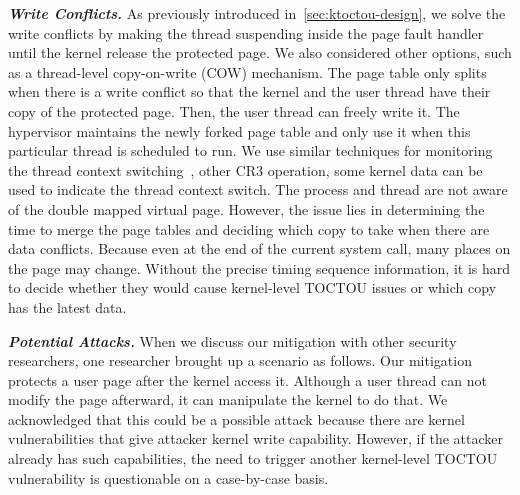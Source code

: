 \textbf{\textit{Write Conflicts.}} As previously introduced in~\autoref{sec:ktoctou-design}, we solve the write conflicts by making the thread suspending inside the page fault handler until the kernel release the protected page. We also considered other options, such as a thread-level copy-on-write (COW) mechanism. The page table only splits when there is a write conflict so that the kernel and the user thread have their copy of the protected page. Then, the user thread can freely write it. The hypervisor maintains the newly forked page table and only use it when this particular thread is scheduled to run. We use similar techniques for monitoring the thread context switching~\cite{pan2017digtool}, other CR3 operation, some kernel data can be used to indicate the thread context switch. The process and thread are not aware of the double mapped virtual page. However, the issue lies in determining the time to merge the page tables and deciding which copy to take when there are data conflicts. Because even at the end of the current system call, many places on the page may change. Without the precise timing sequence information, it is hard to decide whether they would cause kernel-level TOCTOU issues or which copy has the latest data.



\textbf{\textit{Potential Attacks.}} When we discuss our mitigation with other security researchers, one researcher brought up a scenario as follows. Our mitigation protects a user page after the kernel access it. Although a user thread can not modify the page afterward, it can manipulate the kernel to do that. We acknowledged that this could be a possible attack because there are kernel vulnerabilities that give attacker kernel write capability. However, if the attacker already has such capabilities, the need to trigger another kernel-level TOCTOU vulnerability is questionable on a case-by-case basis.

